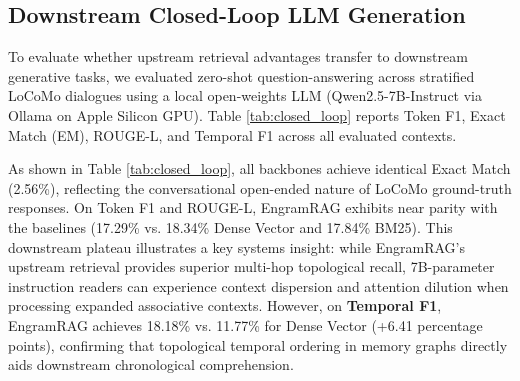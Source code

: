 \documentclass[conference]{IEEEtran}
\begin{document}
\begin{table}[t]
\centering
{}
\caption{Knowledge Update \& Contradiction Resolution benchmark across 50 simulated multi-session mutation episodes.}
\label{tab:knowledge_update}
\end{table}

\subsection{Downstream Closed-Loop LLM Generation}
To evaluate whether upstream retrieval advantages transfer to downstream generative tasks, we evaluated zero-shot question-answering across stratified LoCoMo dialogues using a local open-weights LLM (Qwen2.5-7B-Instruct via Ollama on Apple Silicon GPU). Table \ref{tab:closed_loop} reports Token F1, Exact Match (EM), ROUGE-L, and Temporal F1 across all evaluated contexts.

As shown in Table \ref{tab:closed_loop}, all backbones achieve identical Exact Match (2.56\%), reflecting the conversational open-ended nature of LoCoMo ground-truth responses. On Token F1 and ROUGE-L, EngramRAG exhibits near parity with the baselines (17.29\% vs. 18.34\% Dense Vector and 17.84\% BM25). This downstream plateau illustrates a key systems insight: while EngramRAG's upstream retrieval provides superior multi-hop topological recall, 7B-parameter instruction readers can experience context dispersion and attention dilution when processing expanded associative contexts. However, on \textbf{Temporal F1}, EngramRAG achieves 18.18\% vs. 11.77\% for Dense Vector (+6.41 percentage points), confirming that topological temporal ordering in memory graphs directly aids downstream chronological comprehension.
\end{document}
